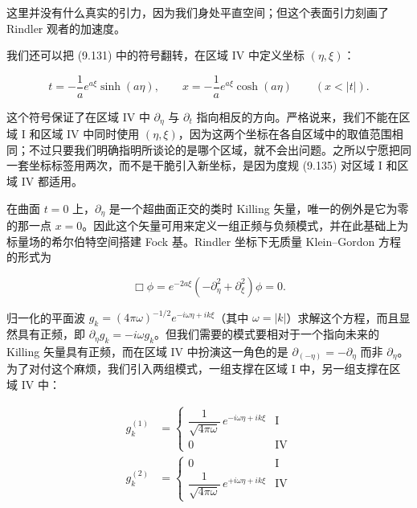 这里并没有什么真实的引力，因为我们身处平直空间；但这个表面引力刻画了 Rindler 观者的加速度。

我们还可以把 (9.131) 中的符号翻转，在区域 IV 中定义坐标 $(\eta,\xi)$：

\begin{equation*}
t = -\frac{1}{a}e^{a\xi}\sinh(a\eta), \qquad x = -\frac{1}{a}e^{a\xi}\cosh(a\eta) \qquad (x < |t|).
\tag{9.139}
\end{equation*}

这个符号保证了在区域 IV 中 $\partial_{\eta}$ 与 $\partial_t$ 指向相反的方向。严格说来，我们不能在区域 I 和区域 IV 中同时使用 $(\eta,\xi)$，因为这两个坐标在各自区域中的取值范围相同；不过只要我们明确指明所谈论的是哪个区域，就不会出问题。之所以宁愿把同一套坐标标签用两次，而不是干脆引入新坐标，是因为度规 (9.135) 对区域 I 和区域 IV 都适用。

在曲面 $t=0$ 上，$\partial_{\eta}$ 是一个超曲面正交的类时 Killing 矢量，唯一的例外是它为零的那一点 $x=0$。因此这个矢量可用来定义一组正频与负频模式，并在此基础上为标量场的希尔伯特空间搭建 Fock 基。Rindler 坐标下无质量 Klein--Gordon 方程的形式为

\begin{equation*}
\Box\phi = e^{-2a\xi}\left(-\partial_{\eta}^{2} + \partial_{\xi}^{2}\right)\phi = 0.
\tag{9.140}
\end{equation*}

归一化的平面波 $g_k = (4\pi\omega)^{-1/2}e^{-i\omega\eta+ik\xi}$（其中 $\omega=|k|$）求解这个方程，而且显然具有正频，即 $\partial_{\eta}g_k=-i\omega g_k$。但我们需要的模式要相对于一个指向未来的 Killing 矢量具有正频，而在区域 IV 中扮演这一角色的是 $\partial_{(-\eta)}=-\partial_{\eta}$ 而非 $\partial_{\eta}$。为了对付这个麻烦，我们引入两组模式，一组支撑在区域 I 中，另一组支撑在区域 IV 中：

\begin{equation*}
\begin{aligned}
g_{k}^{(1)} &= \begin{cases} \dfrac{1}{\sqrt{4\pi\omega}}\, e^{-i\omega\eta+ik\xi} & \mathrm{I} \\[10pt] 0 & \mathrm{IV} \end{cases} \\[14pt]
g_{k}^{(2)} &= \begin{cases} 0 & \mathrm{I} \\[10pt] \dfrac{1}{\sqrt{4\pi\omega}}\, e^{+i\omega\eta+ik\xi} & \mathrm{IV} \end{cases}
\end{aligned}
\tag{9.141}
\end{equation*}

